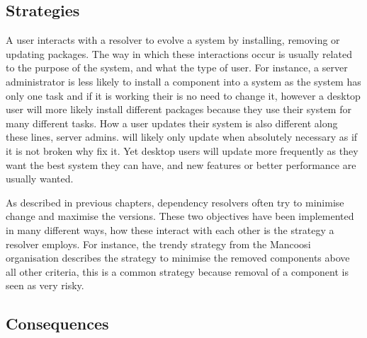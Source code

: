 \subsection{Strategies}
A user interacts with a resolver to evolve a system by installing, removing or updating packages.
The way in which these interactions occur is usually related to the purpose of the system, and what the type of user.
For instance, a server administrator is less likely to install a component into a system as the system has only one task and if it is working their is no need to change it, 
however a desktop user will more likely install different packages because they use their system for many different tasks.
How a user updates their system is also different along these lines, server admins. will likely only update when absolutely necessary as if it is not broken why fix it.
Yet desktop users will update more frequently as they want the best system they can have, and new features or better performance are usually wanted.

As described in previous chapters, dependency resolvers often try to minimise change and maximise the versions.
These two objectives have been implemented in many different ways, how these interact with each other is the strategy a resolver employs.
For instance, the trendy strategy from the Mancoosi organisation describes the strategy to minimise the removed components above all other criteria,
this is a common strategy because removal of a component is seen as very risky.

\subsection{Consequences}





